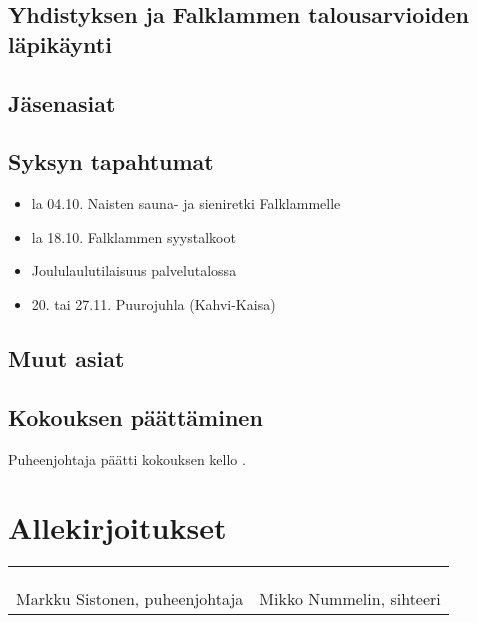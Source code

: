 \documentclass[a4paper,12pt]{article}
\begin{document}
\subsection{Yhdistyksen ja Falklammen talousarvioiden läpikäynti}
\subsection{Jäsenasiat}
\subsection{Syksyn tapahtumat}
\begin{itemize}
\item{la 04.10. Naisten sauna- ja sieniretki Falklammelle}
\item{la 18.10. Falklammen syystalkoot}
\item{Joululaulutilaisuus palvelutalossa}
\item{20. tai 27.11. Puurojuhla (Kahvi-Kaisa)}
\end{itemize}
\subsection{Muut asiat}
\subsection{Kokouksen päättäminen}
Puheenjohtaja päätti kokouksen kello .
\section*{Allekirjoitukset}
\begin{flushleft}
\begin{tabular}{ll}
& \\
& \\
& \\
Markku Sistonen, puheenjohtaja &
Mikko Nummelin, sihteeri %
\end{tabular}
\end{flushleft}
\end{document}
